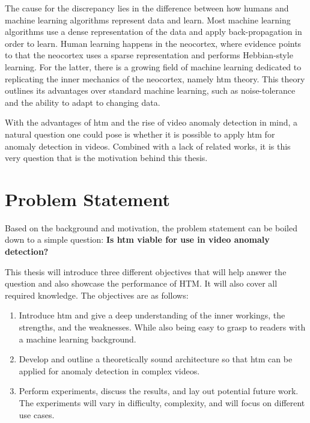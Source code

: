 \par
The cause for the discrepancy lies in the difference between how humans and machine learning algorithms represent data and learn. Most machine learning algorithms use a dense representation of the data and apply back-propagation in order to learn. Human learning happens in the neocortex, where evidence points to that the neocortex uses a sparse representation and performs Hebbian-style learning. For the latter, there is a growing field of machine learning dedicated to replicating the inner mechanics of the neocortex, namely  \gls*{htm} theory. This theory outlines its advantages over standard machine learning, such as noise-tolerance and the ability to adapt to changing data.
\par
With the advantages of  \gls*{htm} and the rise of video anomaly detection in mind, a natural question one could pose is whether it is possible to apply  \gls*{htm} for anomaly detection in videos. Combined with a lack of related works, it is this very question that is the motivation behind this thesis.

\section{Problem Statement}
\label{sec:problem_statement}
Based on the background and motivation, the problem statement can be boiled down to a simple question: \textbf{Is \gls*{htm} viable for use in video anomaly detection?}\par
This thesis will introduce three different objectives that will help answer the question and also showcase the performance of HTM. It will also cover all required knowledge. The objectives are as follows:
\begin{enumerate}
    \item Introduce  \gls*{htm} and give a deep understanding of the inner workings, the strengths, and the weaknesses. While also being easy to grasp to readers with a machine learning background.
    \item Develop and outline a theoretically sound architecture so that  \gls*{htm} can be applied for anomaly detection in complex videos.
    \item Perform experiments, discuss the results, and lay out potential future work. The experiments will vary in difficulty, complexity, and will focus on different use cases.
\end{enumerate}

